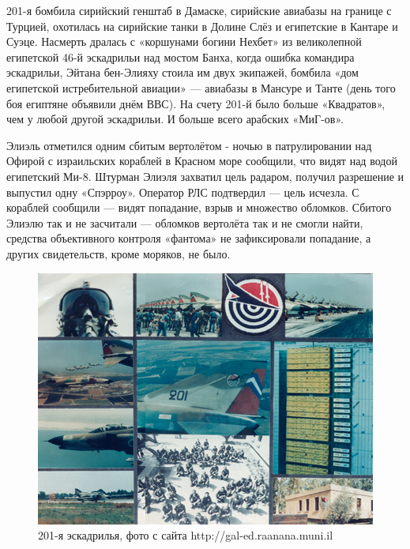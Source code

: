 201-я бомбила сирийский генштаб в Дамаске, сирийские авиабазы на границе с Турцией, охотилась на сирийские танки в Долине Слёз и египетские в Кантаре и Суэце. Насмерть дралась с «коршунами богини Нехбет» из великолепной египетской 46-й эскадрильи над мостом Банха, когда ошибка командира эскадрильи, Эйтана бен-Элияху стоила им двух экипажей, бомбила «дом египетской истребительной авиации» — авиабазы в Мансуре и Танте (день того боя египтяне объявили днём ВВС). На счету 201-й было больше «Квадратов», чем у любой другой эскадрильи. И больше всего арабских «МиГ-ов».

Элиэль отметился одним сбитым вертолётом - ночью в патрулировании над Офирой с израильских кораблей в Красном море сообщили, что видят над водой египетский Ми-8. Штурман Элиэля захватил цель радаром, получил разрешение и выпустил одну «Спэрроу». Оператор РЛС подтвердил — цель исчезла. С кораблей сообщили — видят попадание, взрыв и множество обломков. Сбитого Элиэлю так и не засчитали — обломков вертолёта так и не смогли найти, средства объективного контроля «фантома» не зафиксировали попадание, а других свидетельств, кроме моряков, не было.

\begin{figure}[h!tb] 
	\centering\includegraphics[scale=0.5]{History_Yosya/rcLS8xCibfM.jpg}
	\caption{201-я эскадрилья, фото с сайта http://gal-ed.raanana.muni.il}%
\end{figure}

